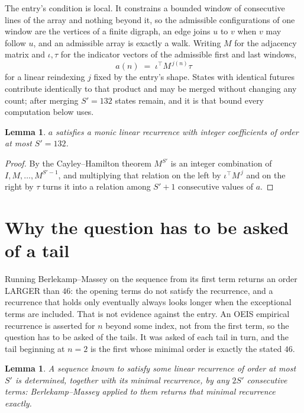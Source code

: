 \documentclass[11pt,a4paper]{article}
\theoremstyle{plain}
\newtheorem{lemma}[theorem]{Lemma}
\theoremstyle{definition}
\begin{document}
The entry's condition is local. It constrains a bounded window of consecutive lines of the
array and nothing beyond it, so the admissible configurations of one window are the vertices of
a finite digraph, an edge joins $u$ to $v$ when $v$ may follow $u$, and an admissible array is
exactly a walk. Writing $M$ for the adjacency matrix and $\iota,\tau$ for the indicator vectors
of the admissible first and last windows,
\[
a(n)\;=\;\iota^{\!\top}M^{\,j(n)}\tau
\]
for a linear reindexing $j$ fixed by the entry's shape. States with identical futures
contribute identically to that product and may be merged without changing any count; after
merging $S'=132$ states remain, and it is that bound every computation below uses.

\begin{lemma}\label{lem:cf}
$a$ satisfies a monic linear recurrence with integer coefficients of order at most $S'=132$.
\end{lemma}

\begin{proof}
By the Cayley--Hamilton theorem $M^{S'}$ is an integer combination of $I,M,\dots,M^{S'-1}$,
and multiplying that relation on the left by $\iota^{\!\top}M^{\,j}$ and on the right by
$\tau$ turns it into a relation among $S'+1$ consecutive values of $a$.
\end{proof}

\section{Why the question has to be asked of a tail}

Running Berlekamp--Massey on the sequence from its first term returns an order LARGER than $46$: the opening terms do not satisfy the recurrence, and a recurrence that holds only eventually always looks longer when the exceptional terms are included. That is not evidence against the entry. An OEIS empirical recurrence is asserted for $n$ beyond some index, not from the first term, so the question has to be asked of the tails. It was asked of each tail in turn, and the tail beginning at $n=2$ is the first whose minimal order is exactly the stated $46$.

\begin{lemma}\label{lem:bm}
A sequence known to satisfy some linear recurrence of order at most $S'$ is determined,
together with its minimal recurrence, by any $2S'$ consecutive terms: Berlekamp--Massey applied
to them returns that minimal recurrence exactly.
\end{lemma}
\end{document}
